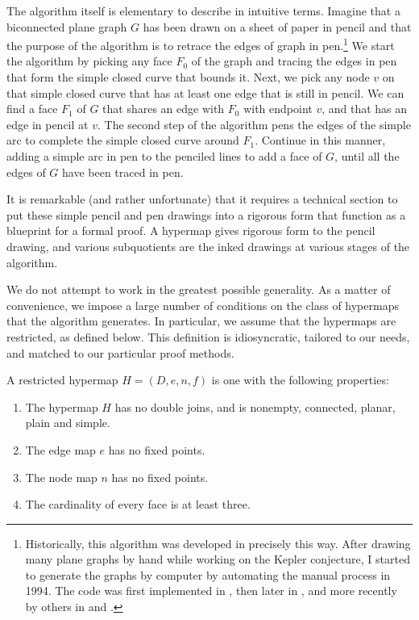 The algorithm itself is  elementary to describe in intuitive
terms.  Imagine that a biconnected plane graph $G$ has been drawn on a
sheet of paper in pencil and that the purpose of the algorithm is to
retrace the edges of graph in pen.\footnote{Historically, this
  algorithm was developed in precisely this way.  After drawing many
  plane graphs by hand while working on the Kepler conjecture, I
  started to generate the graphs by computer by automating the manual
  process in 1994.  The code was first implemented in ,
  then later in , and more recently by others in  and
  .}  We start the algorithm by picking any face $F_0$ of
the graph and tracing the edges in pen that form the simple closed
curve that bounds it.  Next, we pick any node $v$ on that simple
closed curve that has at least one edge that is still in pencil.  We
can find a face $F_1$ of $G$ that shares an edge with $F_0$ with
endpoint $v$, and that has an edge in pencil at $v$.  The second step
of the algorithm pens the edges of the simple arc to complete the
simple closed curve around $F_1$.  Continue in this manner, adding a
simple arc in pen to the penciled lines to add a face of $G$, until
all the edges of $G$ have been traced in pen.  
% 
%

It is remarkable (and rather unfortunate) that it  requires a
technical section  to put these simple pencil and pen
drawings into a rigorous form that function as a blueprint for a
formal proof.  A hypermap gives rigorous form to the pencil drawing, and various
subquotients are the inked drawings at various stages of the algorithm.

We do not attempt to work in the greatest possible generality.  As a
matter of convenience, we impose a large number of conditions on the
class of hypermaps that the algorithm generates.  In particular, we
assume that the hypermaps are restricted, as defined below.  This
definition is idiosyncratic, tailored to our needs, and matched to our
particular proof methods.


\begin{definition}[restricted]\label{def:restricted}
A restricted hypermap $H = (D,e,n,f)$ is one with the following 
properties:
\begin{enumerate}
\item The hypermap $H$ has no double joins, and is nonempty,
  connected, planar, plain and simple.
\item The edge map $e$ has no fixed points.  %
\item The node map $n$ has no fixed points.
\item The cardinality of every face is at least three.
\end{enumerate}
%
%
\end{definition}

